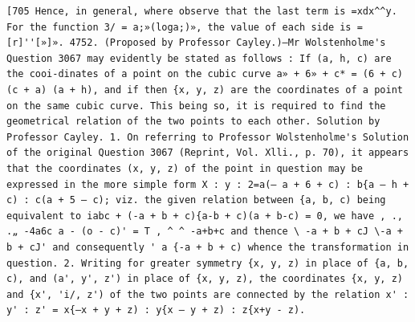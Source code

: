 \documentclass[11pt,a4paper]{book}
\begin{document}
\newpage
\setcounter{page}{592}
\begin{verbatim}
[705 Hence, in general, where observe that the last term is =xdx^^y. For the function 3/ = a;»(loga;)», the value of each side is =[r]''[»]». 4752. (Proposed by Professor Cayley.)—Mr Wolstenholme's Question 3067 may evidently be stated as follows : If (a, h, c) are the cooi-dinates of a point on the cubic curve a» + 6» + c* = (6 + c) (c + a) (a + h), and if then {x, y, z) are the coordinates of a point on the same cubic curve. This being so, it is required to find the geometrical relation of the two points to each other. Solution by Professor Cayley. 1. On referring to Professor Wolstenholme's Solution of the original Question 3067 (Reprint, Vol. Xlli., p. 70), it appears that the coordinates (x, y, z) of the point in question may be expressed in the more simple form X : y : 2=a(— a + 6 + c) : b{a — h + c) : c(a + 5 — c); viz. the given relation between {a, b, c) being equivalent to iabc + (-a + b + c){a-b + c)(a + b-c) = 0, we have , ., .„ -4a6c a - (o - c)' = T , ^ ^ -a+b+c and thence \ -a + b + cJ \-a + b + cJ' and consequently ' a {-a + b + c) whence the transformation in question. 2. Writing for greater symmetry {x, y, z) in place of {a, b, c), and (a', y', z') in place of {x, y, z), the coordinates {x, y, z) and {x', 'i/, z') of the two points are connected by the relation x' : y' : z' = x{—x + y + z) : y{x — y + z) : z{x+y - z). 
\end{verbatim}
\end{document}

